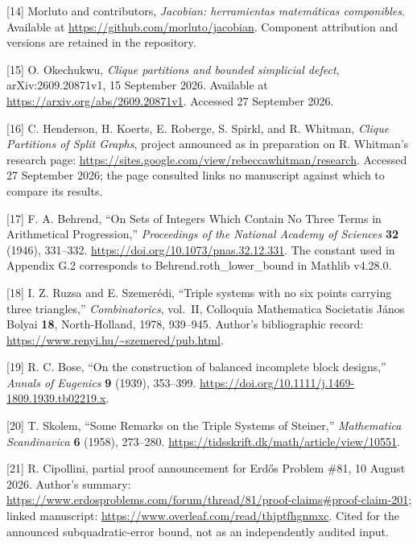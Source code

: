 \documentclass[english,11pt,a4paper]{article}
\begin{document}
{[}14{]} Morluto and contributors, \emph{Jacobian: herramientas matemáticas componibles}. Available at \url{https://github.com/morluto/jacobian}. Component attribution and versions are retained in the repository.

{[}15{]} O. Okechukwu, \emph{Clique partitions and bounded simplicial defect}, arXiv:2609.20871v1, 15 September 2026. Available at \url{https://arxiv.org/abs/2609.20871v1}. Accessed 27 September 2026.

{[}16{]} C. Henderson, H. Koerts, E. Roberge, S. Spirkl, and R. Whitman, \emph{Clique Partitions of Split Graphs}, project announced as in preparation on R. Whitman's research page: \url{https://sites.google.com/view/rebeccawhitman/research}. Accessed 27 September 2026; the page consulted links no manuscript against which to compare its results.

{[}17{]} F. A. Behrend, ``On Sets of Integers Which Contain No Three Terms in Arithmetical Progression,'' \emph{Proceedings of the National Academy of Sciences} \textbf{32} (1946), 331--332. \url{https://doi.org/10.1073/pnas.32.12.331}. The constant used in Appendix G.2 corresponds to {\ttfamily\small Behrend.\discretionary{\hbox{\ensuremath{\hookrightarrow}}}{}{}roth\_\discretionary{\hbox{\ensuremath{\hookrightarrow}}}{}{}lower\_\discretionary{\hbox{\ensuremath{\hookrightarrow}}}{}{}bound} in Mathlib v4.28.0.

{[}18{]} I. Z. Ruzsa and E. Szemerédi, ``Triple systems with no six points carrying three triangles,'' \emph{Combinatorics}, vol.~II, Colloquia Mathematica Societatis János Bolyai \textbf{18}, North-Holland, 1978, 939--945. Author's bibliographic record: \url{https://www.renyi.hu/~szemered/pub.html}.

{[}19{]} R. C. Bose, ``On the construction of balanced incomplete block designs,'' \emph{Annals of Eugenics} \textbf{9} (1939), 353--399. \url{https://doi.org/10.1111/j.1469-1809.1939.tb02219.x}.

{[}20{]} T. Skolem, ``Some Remarks on the Triple Systems of Steiner,'' \emph{Mathematica Scandinavica} \textbf{6} (1958), 273--280. \url{https://tidsskrift.dk/math/article/view/10551}.

{[}21{]} R. Cipollini, partial proof announcement for Erdős Problem \#81, 10 August 2026. Author's summary: \url{https://www.erdosproblems.com/forum/thread/81/proof-claims\#proof-claim-201}; linked manuscript: \url{https://www.overleaf.com/read/thjptfhgnmxc}. Cited for the announced subquadratic-error bound, not as an independently audited input.
\end{document}
